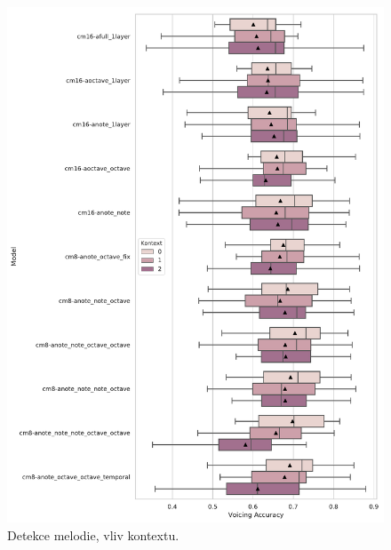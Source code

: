 \begin{figure}[h]\centering
    \includegraphics[scale=0.6]{../img/figures/voicing_context}
\caption{Detekce melodie, vliv kontextu.}\label{obr:voicing_context}
\end{figure}
